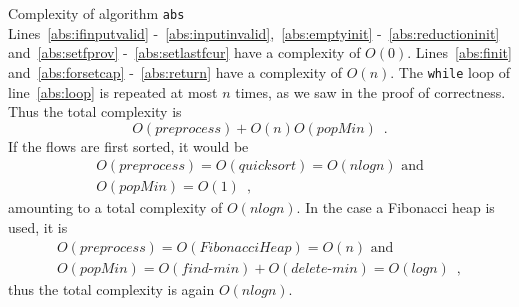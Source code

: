 \begin{sepproof}{Complexity of algorithm \texttt{abs}} \ \\
  Lines~\ref{abs:ifinputvalid} -~\ref{abs:inputinvalid},~\ref{abs:emptyinit} -~\ref{abs:reductioninit} and~\ref{abs:setfprov}
  -~\ref{abs:setlastfcur} have a complexity of $O\left(0\right)$. Lines~\ref{abs:finit} and~\ref{abs:forsetcap}
  -~\ref{abs:return} have a complexity of $O\left(n\right)$. The \texttt{while} loop of line~\ref{abs:loop} is repeated at
  most $n$ times, as we saw in the proof of correctness. Thus the total complexity is
  \begin{equation*}
    O\left(preprocess\right) + O\left(n\right)O\left(popMin\right) \enspace.
  \end{equation*}
  If the flows are first sorted, it would be
  \begin{equation*}
  \begin{gathered}
    O\left(preprocess\right) = O\left(quicksort\right) = O\left(nlogn\right) \mbox{ and} \\
    O\left(popMin\right) = O\left(1\right) \enspace,
  \end{gathered}
  \end{equation*}
  amounting to a total complexity of $O\left(nlogn\right)$. In the case a Fibonacci heap is used, it is
  \begin{equation*}
  \begin{gathered}
    O\left(preprocess\right) = O\left(FibonacciHeap\right) = O\left(n\right) \mbox{ and} \\
    O\left(popMin\right) = O\left(find\mbox{-}min\right) + O\left(delete\mbox{-}min\right) = O\left(logn\right) \enspace,
  \end{gathered}
  \end{equation*}
  thus the total complexity is again $O\left(nlogn\right)$.
\end{sepproof}
